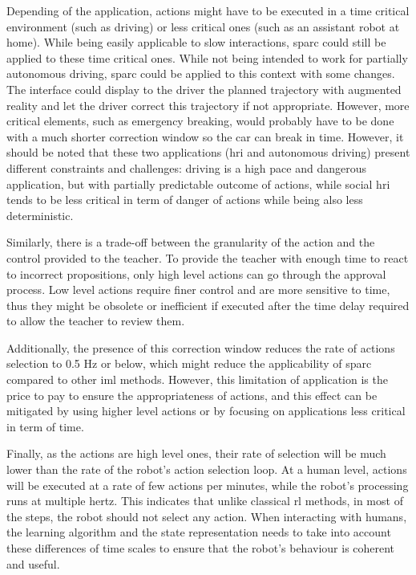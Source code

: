 Depending of the application, actions might have to be executed in a time critical environment (such as driving) or less critical ones (such as an assistant robot at home). While being easily applicable to slow interactions, \gls{sparc} could still be applied to these time critical ones. While not being intended to work for partially autonomous driving, \gls{sparc} could be applied to this context with some changes. The interface could display to the driver the planned trajectory with augmented reality and let the driver correct this trajectory if not appropriate. However, more critical elements, such as emergency breaking, would probably have to be done with a much shorter correction window so the car can break in time. However, it should be noted that these two applications (\gls{hri} and autonomous driving) present different constraints and challenges: driving is a high pace and dangerous application, but with partially predictable outcome of actions, while social \gls{hri} tends to be less critical in term of danger of actions while being also less deterministic.

Similarly, there is a trade-off between the granularity of the action and the control provided to the teacher. To provide the teacher with enough time to react to incorrect propositions, only high level actions can go through the approval process. Low level actions require finer control and are more sensitive to time, thus they might be obsolete or inefficient if executed after the time delay required to allow the teacher to review them.

Additionally, the presence of this correction window reduces the rate of actions selection to 0.5 Hz or below, which might reduce the applicability of \gls{sparc} compared to other \gls{iml} methods. However, this limitation of application is the price to pay to ensure the appropriateness of actions, and this effect can be mitigated by using higher level actions or by focusing on applications less critical in term of time. 

Finally, as the actions are high level ones, their rate of selection will be much lower than the rate of the robot's action selection loop. At a human level, actions will be executed at a rate of few actions per minutes, while the robot's processing runs at multiple hertz. This indicates that unlike classical \gls{rl} methods, in most of the steps, the robot should not select any action. When interacting with humans, the learning algorithm and the state representation needs to take into account these differences of time scales to ensure that the robot's behaviour is coherent and useful.

